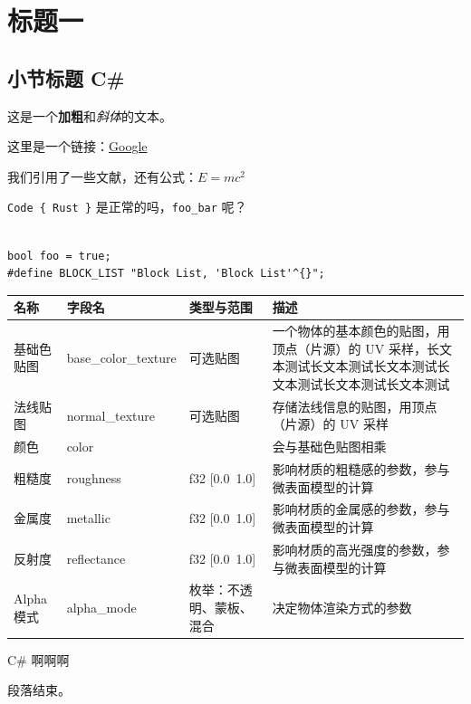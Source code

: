 \chapter{标题一}
\section{小节标题 C\#}
这是一个\textbf{加粗}和\textit{斜体}的文本。

这里是一个链接：\href{https://www.google.com}{Google}

我们引用了一些文献\cite{foo}，还有公式：$E = mc^2$

\texttt{Code \{ Rust \}} 是正常的吗，\texttt{foo\_bar} 呢？

\begin{lstlisting}

bool foo = true;
#define BLOCK_LIST "Block List, 'Block List'^{}";
\end{lstlisting}


\begin{tabularx}{\textwidth}{|>{\centering\arraybackslash}X|>{\centering\arraybackslash}X|>{\centering\arraybackslash}X|>{\centering\arraybackslash}X|} \hline
名称 & 字段名 & 类型与范围 & 描述 \\ \hline
基础色贴图 & base\_color\_texture & 可选贴图 & 一个物体的基本颜色的贴图，用顶点（片源）的 UV 采样，长文本测试长文本测试长文本测试长文本测试长文本测试长文本测试 \\ \hline
法线贴图 & normal\_texture & 可选贴图 & 存储法线信息的贴图，用顶点（片源）的 UV 采样 \\ \hline
颜色 & color & [f32; 4] & 会与基础色贴图相乘 \\ \hline
粗糙度 & roughness & f32 [0.0~1.0] & 影响材质的粗糙感的参数，参与微表面模型的计算 \\ \hline
金属度 & metallic & f32 [0.0~1.0] & 影响材质的金属感的参数，参与微表面模型的计算 \\ \hline
反射度 & reflectance & f32 [0.0~1.0] & 影响材质的高光强度的参数，参与微表面模型的计算 \\ \hline
Alpha 模式 & alpha\_mode & 枚举：不透明、蒙板、混合 & 决定物体渲染方式的参数 \\ \hline
\end{tabularx}

C\# 啊啊啊

段落结束。

